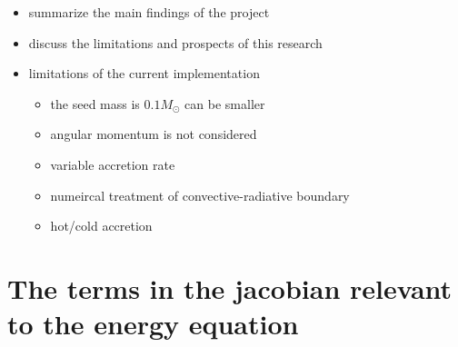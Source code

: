 \documentclass[12pt,a4paper]{article}
\newenvironment{outline}[1]{%
  \begin{itemize}[label=\textbullet]%
  \color{#1}%
}{%
  \end{itemize}%
}
\begin{document}
\begin{outline}{gray}
  \item summarize the main findings of the project
  \item discuss the limitations and prospects of this research
  \item limitations of the current implementation
  \begin{itemize}
    \item the seed mass is $0.1 M_\odot$ can be smaller
    \item angular momentum is not considered
    \item variable accretion rate
    \item numeircal treatment of convective-radiative boundary
    \item hot/cold accretion
  \end{itemize}
\end{outline}


\newpage
\printbibliography[heading=bibintoc, title={References}]

\newpage
{}
\appendix

\section*{The terms in the jacobian relevant to the energy equation}
\label{app:jacobian}
\renewcommand{\theequation}{A.\arabic{equation}}
\setcounter{equation}{0}
\end{document}
